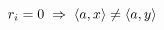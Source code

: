 \documentclass[preview]{standalone}
\begin{document}
\begin{center}
$r_i=0 \hspace{0.1cm}\Rightarrow\hspace{0.1cm} \langle a, x\rangle \neq \langle a,y \rangle $
\end{center}
\end{document}
